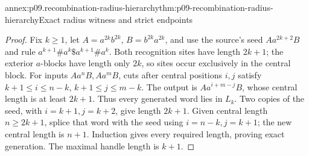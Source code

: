\begin{annexitem}{annex:p09.recombination-radius-hierarchy}{thm:p09-recombination-radius-hierarchy}{Exact radius witness and strict endpoints}
\begin{proof}
Fix \(k\geq1\), let \(A=a^{2k}b^{2k}\), \(B=b^{2k}a^{2k}\),
and use the source's seed \(Aa^{2k+2}B\) and rule
\(a^{k+1}\#a^k\$a^{k+1}\#a^k\).
Both recognition sites have length \(2k+1\); the exterior \(a\)-blocks
have length only \(2k\), so sites occur exclusively in the central block.
For inputs \(Aa^nB,Aa^mB\), cuts after central positions \(i,j\) satisfy
\(k+1\leq i\leq n-k\), \(k+1\leq j\leq m-k\).
The output is \(Aa^{i+m-j}B\), whose central length is at least \(2k+1\).
Thus every generated word lies in \(L_k\).
Two copies of the seed, with \(i=k+1,j=k+2\), give length \(2k+1\).
Given central length \(n\geq2k+1\), splice that word with the seed
using \(i=n-k,j=k+1\); the new central length is \(n+1\).
Induction gives every required length, proving exact generation.
The maximal handle length is \(k+1\).


\end{proof}
\end{annexitem}
